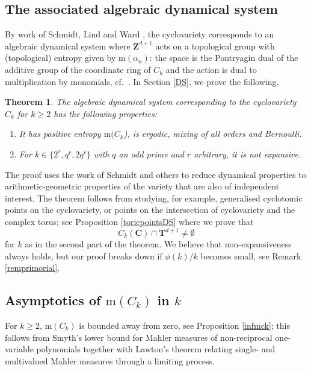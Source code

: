 \documentclass[12pt,reqno]{amsart}
\newtheorem{introtheorem}{Theorem}
\theoremstyle{definition}
\theoremstyle{plain}
\theoremstyle{definition}
\newcommand{\Z}{\mathbf{Z}}
\newcommand{\Cc}{\mathbf{C}}
\newcommand{\T}{\mathbf{T}}
\newcommand\m{\mathrm{m}}
\renewcommand{\geq}{\geqslant}
\begin{document}
\subsection*{The associated algebraic dynamical system} 

By work of Schmidt, Lind and Ward \cite{SchmidtLindWard}, the cyclovariety corresponds to an algebraic dynamical system where $\Z^{d+1}$ acts on a topological group with (topological) entropy given by $\m(\alpha_n)$: the space is the Pontryagin dual of the additive group of the coordinate ring of $C_k$ and the action is dual to multiplication by monomials, cf.\ 
\cite{Schmidt}. In Section \ref{DS}, we prove the following.

\begin{introtheorem} \label{mainDyn} 
The algebraic dynamical system corresponding to the cyclovariety $C_k$ for $k \geq 2$ has the following properties: 
\begin{enumerate} 
\item It has positive entropy $\m(C_k$), is ergodic, mixing of all orders and Bernoulli. 
\item For $k\in \{2^r, q^r, 2q^r\}$ with $q$ an odd prime and $r$ arbitrary, it is not expansive. 
\end{enumerate} 
\end{introtheorem}

The proof uses the work of Schmidt and others to reduce dynamical properties to arithmetic-geometric properties of the variety that are also of independent interest. The theorem follows from studying, for example, generalised cyclotomic points on the cyclovariety, or points on the intersection of cyclovariety and the complex torus; see Proposition \ref{toricpointsDS} where we prove that \begin{equation} \label{introinter} C_k(\Cc) \cap \T^{d+1} \neq \emptyset \end{equation} for $k$ as in the second part of the theorem. We believe that non-expansiveness always holds, but our proof breaks down if $\phi(k)/k$ becomes small, see Remark \ref{remprimorial}.  

\subsection*{Asymptotics of $\m(C_k)$ in $k$} 
For $k 
\geq 2$, $\m(C_k)$ is bounded away from zero, see Proposition \ref{infmck}; this follows from Smyth's lower bound for Mahler measures of non-reciprocal one-variable polynomials together with Lawton's theorem relating single- and multivalued Mahler measures through a limiting process.  
\end{document}
